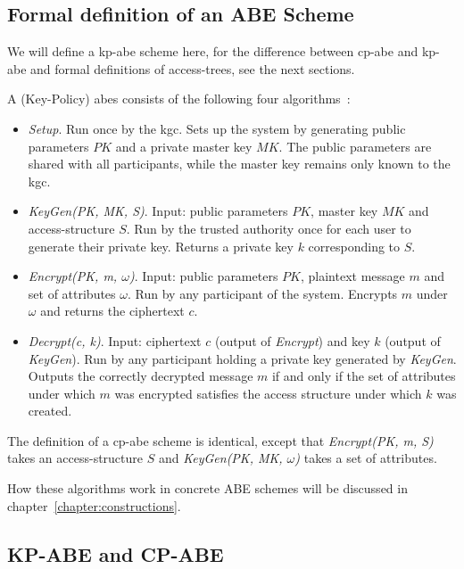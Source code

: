 \subsection{Formal definition of an ABE Scheme}\label{sec:definition-es}

We will define a \acrshort{kp-abe} scheme here, for the difference between \acrshort{cp-abe} and \acrshort{kp-abe} and formal definitions of \glspl{access-tree}, see the next sections.

\begin{definition}
    A (Key-Policy) \Acrlong{abes} consists of the following four algorithms~\cite{goyal_attribute-based_2006}:
    \begin{itemize}
        \item \emph{Setup}. Run once by the \acrfull{kgc}. Sets up the system by generating public parameters $PK$ and a private master key $MK$. The public parameters are shared with all participants, while the master key remains only known to the \acrshort{kgc}.
        \item \emph{KeyGen(PK, MK, S)}. Input: public parameters $PK$, master key $MK$ and \gls{access-structure} $S$.
        Run by the trusted authority once for each user to generate their private key. Returns a private key $k$ corresponding to $S$.
        \item \emph{Encrypt(PK, m, $\omega$)}. Input: public parameters $PK$, plaintext message $m$ and set of attributes $\omega$.
        Run by any participant of the system. Encrypts $m$ under $\omega$ and returns the ciphertext $c$.
        \item \emph{Decrypt(c, k)}. Input: ciphertext $c$ (output of \emph{Encrypt}) and key $k$ (output of \emph{KeyGen}).
        Run by any participant holding a private key generated by \emph{KeyGen}. Outputs the correctly decrypted message $m$ if and only if the set of attributes under which $m$ was encrypted satisfies the access structure under which $k$ was created.
    \end{itemize}
\end{definition}

The definition of a \acrshort{cp-abe} scheme is identical, except that \emph{Encrypt(PK, m, S)} takes an \gls{access-structure} $S$ and \emph{KeyGen(PK, MK, $\omega$)} takes a set of attributes.

How these algorithms work in concrete ABE schemes will be discussed in chapter~\ref{chapter:constructions}.

\subsection{KP-ABE and CP-ABE}\label{sec:cp-vs-kp}



